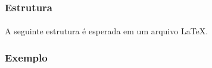 \begin{frame}[fragile]
\frametitle{Estrutura}
\framesubtitle{}
  A seguinte estrutura é esperada em um arquivo \LaTeX{}.

%
\end{frame}

\begin{frame}[fragile]
\frametitle{Exemplo}
\framesubtitle{}
  \scriptsize
  \begin{columns}[c]
%
%
  \vspace{-0.3cm}
  \begin{figure}[h!]
  \centering
  \setlength\fboxsep{0pt}
  \setlength\fboxrule{0.5pt}
  \label{fig:minimal}
  \end{figure}
  \end{columns}
\end{frame}

